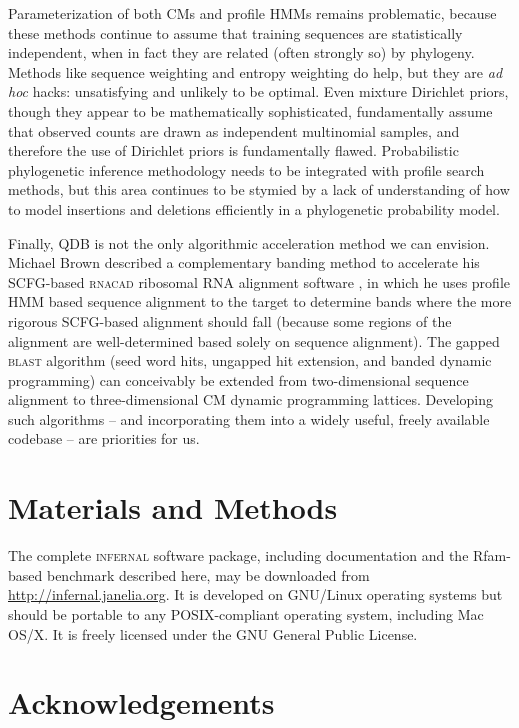 \documentclass[11pt]{article}
\begin{document}
Parameterization of both CMs and profile HMMs remains problematic,
because these methods continue to assume that training sequences are
statistically independent, when in fact they are related (often
strongly so) by phylogeny. Methods like sequence weighting and entropy
weighting do help, but they are \emph{ad hoc} hacks: unsatisfying and
unlikely to be optimal. Even mixture Dirichlet priors, though they
appear to be mathematically sophisticated, fundamentally assume that
observed counts are drawn as independent multinomial samples, and
therefore the use of Dirichlet priors is fundamentally flawed.
Probabilistic phylogenetic inference methodology needs to be
integrated with profile search methods, but this area continues to be
stymied by a lack of understanding of how to model insertions and
deletions efficiently in a phylogenetic probability model.

Finally, QDB is not the only algorithmic acceleration method we can
envision.  Michael Brown described a complementary banding method to
accelerate his SCFG-based \textsc{rnacad} ribosomal RNA alignment
software \cite{Brown00}, in which he uses profile HMM based sequence
alignment to the target to determine bands where the more rigorous
SCFG-based alignment should fall (because some regions of the
alignment are well-determined based solely on sequence alignment). The
gapped \textsc{blast} algorithm (seed word hits, ungapped hit extension, and
banded dynamic programming) can conceivably be extended from
two-dimensional sequence alignment to three-dimensional CM dynamic
programming lattices. Developing such algorithms -- and incorporating
them into a widely useful, freely available codebase -- are priorities
for us.

\section{Materials and Methods}

The complete \textsc{infernal} software package, including
documentation and the Rfam-based benchmark described here, may be
downloaded from \url{http://infernal.janelia.org}. It is developed on
GNU/Linux operating systems but should be portable to any
POSIX-compliant operating system, including Mac OS/X. It is freely
licensed under the GNU General Public License.

\section{Acknowledgements}
\end{document}
